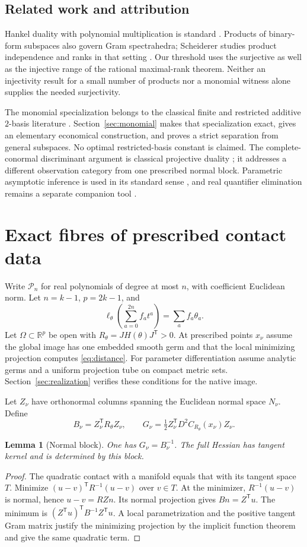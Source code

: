 \documentclass[11pt,reqno]{amsart}
\numberwithin{equation}{section}
\newtheorem{lemma}[theorem]{Lemma}
\theoremstyle{definition}\newtheorem{definition}[theorem]{Definition}
\theoremstyle{remark}\newtheorem{remark}[theorem]{Remark}
\newcommand{\R}{\mathbb R}
\newcommand{\PP}{\mathcal P}
\begin{document}
\subsection*{Related work and attribution}
Hankel duality with polynomial multiplication is standard \cite{MP}. Products of binary-form subspaces also govern Gram spectrahedra; Scheiderer studies product independence and ranks in that setting \cite{Sch}. Our threshold uses the surjective as well as the injective range of the rational maximal-rank theorem. Neither an injectivity result for a small number of products nor a monomial witness alone supplies the needed surjectivity.

The monomial specialization belongs to the classical finite and restricted additive $2$-basis literature \cite{Yu,Kohonen17,Kohonen14}. Section~\ref{sec:monomial} makes that specialization exact, gives an elementary economical construction, and proves a strict separation from general subspaces. No optimal restricted-basis constant is claimed. The complete-conormal discriminant argument is classical projective duality \cite{GKZ}; it addresses a different observation category from one prescribed normal block. Parametric asymptotic inference is used in its standard sense \cite{vdV}, and real quantifier elimination remains a separate companion tool \cite{BPR}.

\section{Exact fibres of prescribed contact data}\label{sec:contact}
Write $\PP_n$ for real polynomials of degree at most $n$, with coefficient Euclidean norm. Let $n=k-1$, $p=2k-1$, and
\[
 \ell_\theta\left(\sum_{a=0}^{2n}f_at^a\right)=\sum_a f_a\theta_a.
\]
Let $\Omega\subset\R^p$ be open with $R_\theta=JH(\theta)J^{\mathsf T}>0$. At prescribed points $x_\nu$ assume the global image has one embedded smooth germ and that the local minimizing projection computes \eqref{eq:distance}. For parameter differentiation assume analytic germs and a uniform projection tube on compact metric sets. Section~\ref{sec:realization} verifies these conditions for the native image.

Let $Z_\nu$ have orthonormal columns spanning the Euclidean normal space $N_\nu$. Define
\[
 B_\nu=Z_\nu^{\mathsf T}R_\theta Z_\nu,
 \qquad G_\nu=\tfrac12 Z_\nu^{\mathsf T}D^2C_{R_\theta}(x_\nu)Z_\nu.
\]
\begin{lemma}[Normal block]\label{lem:normal}
One has $G_\nu=B_\nu^{-1}$. The full Hessian has tangent kernel and is determined by this block.
\end{lemma}
\begin{proof}
The quadratic contact with a manifold equals that with its tangent space $T$. Minimize $(u-v)^{\mathsf T}R^{-1}(u-v)$ over $v\in T$. At the minimizer, $R^{-1}(u-v)$ is normal, hence $u-v=RZn$. Its normal projection gives $Bn=Z^{\mathsf T}u$. The minimum is $(Z^{\mathsf T}u)^{\mathsf T}B^{-1}Z^{\mathsf T}u$. A local parametrization and the positive tangent Gram matrix justify the minimizing projection by the implicit function theorem and give the same quadratic term.
\end{proof}
\end{document}

